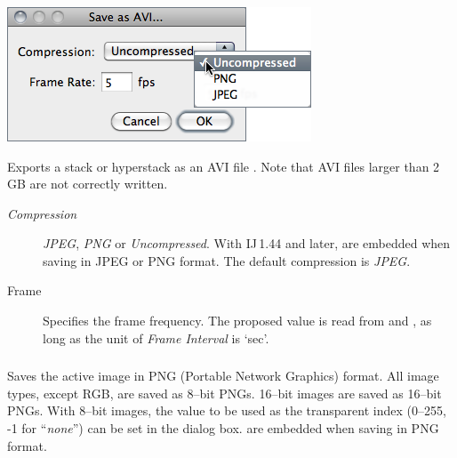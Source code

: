 \subsubsection{\protect{}\label{sub:SaveAs>Avi...}}

\begin{minipage}[c][1\totalheight][t]{0.47\columnwidth}%
\includegraphics[scale=0.55]{images/SaveAsAvi}%
\end{minipage}%
\begin{minipage}[c][1\totalheight][t]{0.53\columnwidth}%
Exports a stack or hyperstack as an AVI
file \cite{C-AviPlugins}. Note that AVI files larger than 2\,GB
are not correctly written.
\begin{description}
\item [{\emph{Compression}}] \emph{JPEG}, \emph{PNG} or \emph{Uncompressed}.
With IJ\,1.44 and later,  are embedded
when saving in JPEG or PNG format. The default compression is \emph{JPEG}. \end{description}
%
\end{minipage}
\begin{description}
\item [{Frame}] Specifies the frame frequency. The proposed value is read
from 
and ,
as long as the unit of \emph{Frame Interval} is `sec'.
\end{description}



\subsubsection{\protect{}\label{sub:PNG...}}

Saves the active image in PNG (Portable Network Graphics)
format. All image types, except RGB, are saved as 8--bit PNGs. 16--bit
images are saved as 16--bit PNGs. With 8--bit images, the value to
be used as the transparent index (0--255, -1 for ``\emph{none}'')
can be set in the 
dialog box.  are embedded when saving
in PNG format. 


